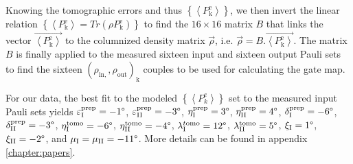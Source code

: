 Knowing the tomographic errors and thus $\left\{ \left\langle P_{\mathrm{k}}^{\mathrm{e}}\right\rangle \right\} $,
we then invert the linear relation $\left\{ \left\langle P_{\mathrm{k}}^{\mathrm{e}}\right\rangle =Tr\left(\rho P_{\mathrm{k}}^{\mathrm{e}}\right)\right\} $
to find the $16\times16$ matrix $B$ that links the vector $\overrightarrow{\left\langle P_{\mathrm{k}}^{\mathrm{e}}\right\rangle }$
to the columnized density matrix $\overrightarrow{\rho}$, i.e. $\overrightarrow{\rho}=B.\overrightarrow{\left\langle P_{\mathrm{k}}^{\mathrm{e}}\right\rangle }$.
The matrix $B$ is finally applied to the measured sixteen input and
sixteen output Pauli sets to find the sixteen $(\rho_{\mathrm{in},},\rho_{\mathrm{out}})_{\mathrm{k}}$
couples to be used for calculating the gate map.

\smallskip

For our data, the best fit to the modeled $\left\{ \left\langle P_{k}^{e}\right\rangle \right\} $
set to the measured input Pauli sets yields $\varepsilon_{\mathrm{I}}^{\mathrm{prep}}=-1\text{\textdegree}$,
$\varepsilon_{\mathrm{II}}^{\mathrm{prep}}=-3\text{\textdegree}$,
$\eta_{\mathrm{I}}^{\mathrm{prep}}=3\text{\textdegree}$, $\mathrm{\eta}_{\mathrm{II}}^{\mathrm{prep}}=4\text{\textdegree}$,
$\delta_{\mathrm{I}}^{\mathrm{prep}}=-6\text{\textdegree}$, $\delta_{\mathrm{II}}^{\mathrm{prep}}=-3\text{\textdegree}$,
$\eta_{\mathrm{I}}^{\mathrm{tomo}}=-6\text{\textdegree}$, $\eta_{\mathrm{II}}^{\mathrm{tomo}}=-4\text{\textdegree}$,
$\lambda_{\mathrm{I}}^{t\mathrm{omo}}=12\text{\textdegree}$, $\lambda_{\mathrm{II}}^{\mathrm{tomo}}=5\text{\textdegree}$,
$\xi_{\mathrm{I}}=1\text{\textdegree}$, $\xi_{\mathrm{II}}=-2\text{\textdegree}$,
and $\mu_{\mathrm{I}}=\mu_{\mathrm{II}}=-11\text{\textdegree}$. More details can be found in appendix \ref{chapter:papers}.



